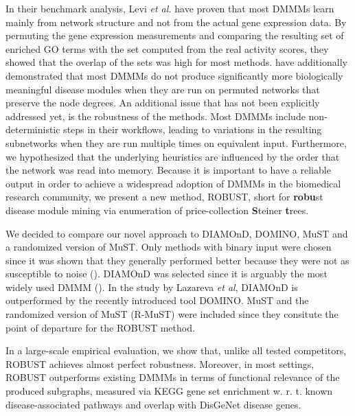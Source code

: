 \documentclass{bioinfo}
\begin{document}
In their benchmark analysis, Levi \textit{et al.} have proven that most DMMMs learn mainly from network structure and not from the actual gene expression data. By permuting the gene expression measurements and comparing the resulting set of enriched GO terms with the set computed from the real activity scores, they showed that the overlap of the sets was high for most methods.  \cite{amim_lazareva2021} have additionally demonstrated that most DMMMs do not produce significantly more biologically meaningful disease modules when they are run on permuted networks that preserve the node degrees. An additional issue that has not been explicitly addressed yet, is the robustness of the methods. Most DMMMs include non-deterministic steps in their workflows, leading to variations in the resulting subnetworks when they are run multiple times on equivalent input. Furthermore, we hypothesized that the underlying heuristics are influenced by the order that the network was read into memory.  Because it is important to have a reliable output in order to achieve a widespread adoption of DMMMs in the biomedical research community, we present a new method, ROBUST, short for \textbf{robu}st disease module mining via enumeration of price-collection \textbf{S}teiner \textbf{t}rees. %

We decided to compare our novel approach to DIAMOnD, DOMINO, MuST and a randomized version of MuST. Only methods with binary input were chosen since it was shown that they generally performed better because they were not as susceptible to noise (\cite{domino_levi2021}). DIAMOnD was selected since it is arguably the most widely used DMMM (\cite{diamond_popular_cui2019}). In the study by Lazareva \textit{et al}, DIAMOnD is outperformed by the recently introduced tool DOMINO. MuST and the randomized version of MuST (R-MuST) were included since they consitute the point of departure for the ROBUST method. %

In a large-scale empirical evaluation, we show that, unlike all tested competitors, ROBUST achieves almost perfect robustness. Moreover, in most settings, ROBUST outperforms  existing  DMMMs  in  terms  of  functional  relevance  of  the  produced  subgraphs, measured via KEGG gene set enrichment w. r. t. known disease-associated pathways and overlap with DisGeNet disease genes.
\end{document}
